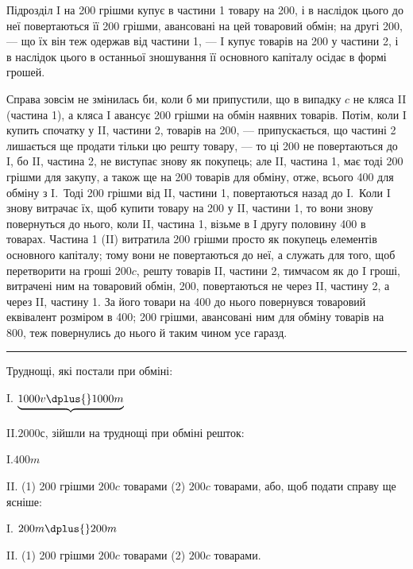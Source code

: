 
Підрозділ I на 200 грішми купує в частини 1 товару на
200, і в наслідок цього до неї повертаються її 200 грішми,
авансовані на цей товаровий обмін; на другі 200, — що їх він
теж одержав від частини 1, — I купує товарів на 200 у частини 2, і в
наслідок цього в останньої зношування її основного капіталу осідає в
формі грошей.

\vtyagnut{}
Справа зовсім не змінилась би, коли б ми припустили, що в випадку
$c$ не кляса II (частина 1), а кляса I авансує 200 грішми на обмін наявних
товарів. Потім, коли I купить спочатку у II, частини 2, товарів на
200, — припускається, що частині 2 лишається ще продати тільки цю
решту товару, — то ці 200 не повертаються до I, бо II, частина
2, не виступає знову як покупець; але II, частина 1, має тоді 200
грішми для закупу, а також ще на 200 товарів для обміну, отже, всього
400 для обміну з I.~Тоді 200 грішми від II, частини 1, повертаються
назад до I.~Коли I знову витрачає їх, щоб купити товару на
200 у II, частини 1, то вони знову повернуться до нього, коли II,
частина 1, візьме в I другу половину 400 в товарах. Частина 1 (II)
витратила 200 грішми просто як покупець елементів основного
капіталу; тому вони не повертаються до неї, а служать для того,
щоб перетворити на гроші $200 c$, решту товарів II, частини 2, тимчасом
як до I гроші, витрачені ним на товаровий обмін, 200, повертаються
не через II, частину 2, а через II, частину 1. За його товари
на 400 до нього повернувся товаровий еквівалент розміром в 400;
200 грішми, авансовані ним для обміну товарів на 800, теж
повернулись до нього й таким чином усе гаразд.

\fancybreak{*\quad*\quad*}
\medskip{}
\noindent{}Труднощі, які постали при обміні:

I. $\underbrace{1000 v \dplus{} 1000 m}^{}$

II.\makebox[20pt]{}$2000 с$, зійшли на труднощі при обміні решток:

I.\makebox[25pt]{\dotfill{}}$400 m$

II. (1) 200 грішми \dplus{} $200 c$ товарами \dplus{} (2) $200 c$ товарами, або, щоб
подати справу ще ясніше:

I.  $200 m \dplus{} 200 m$

II. (1) 200 грішми \dplus{} $200 c$ товарами \dplus{} (2) $200 c$ товарами.

